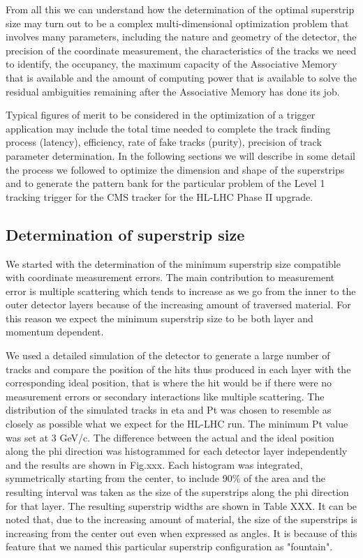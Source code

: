 	From all this we can understand how the determination of the optimal superstrip size may turn out to be a complex multi-dimensional optimization problem that involves many parameters, including the nature and geometry of the detector, the precision of the coordinate measurement, the characteristics of the tracks we need to identify, the occupancy, the maximum capacity of the Associative Memory that is available and the amount of computing power that is available to solve the residual ambiguities remaining after the Associative Memory has done its job.

	Typical figures of merit to be considered in the optimization of a trigger application may include the total time needed to complete the track finding process (latency), efficiency, rate of fake tracks (purity), precision of track parameter determination.
In the following sections we will describe in some detail the process we followed to optimize the dimension and shape of the superstrips and to generate the pattern bank for the particular problem of the Level 1 tracking trigger for the CMS tracker for the HL-LHC Phase II upgrade.



\subsection{Determination of superstrip size}


We started with the determination of the minimum superstrip size compatible with coordinate measurement errors. The main contribution to measurement error is multiple scattering which  tends to increase as we go from the inner to the outer detector layers because of the increasing amount of traversed material. For this reason we expect the minimum superstrip size to be both layer and momentum dependent.

We used a detailed simulation of the detector to generate a large number of tracks and compare the position of the hits thus produced in each layer with the corresponding ideal position, that is where the hit would be if there were no measurement errors or secondary interactions like multiple scattering. 
The distribution of the simulated tracks in eta and Pt was chosen to resemble as closely as possible what we expect for the HL-LHC run. The minimum Pt value was set at 3 GeV/c.
The difference between the actual and the ideal position along the phi direction was histogrammed for each detector layer independently and the results are shown in Fig.xxx.
Each histogram was integrated, symmetrically starting from the center, to include 90\% of the area and the resulting interval was taken as the size of the superstrips along the phi direction for that layer. The resulting superstrip widths are shown in Table XXX. It can be noted that, due to the increasing amount of material, the size of the superstrips is increasing from the center out even when expressed as angles. It is because of this feature that we named this particular superstrip configuration as "fountain".

